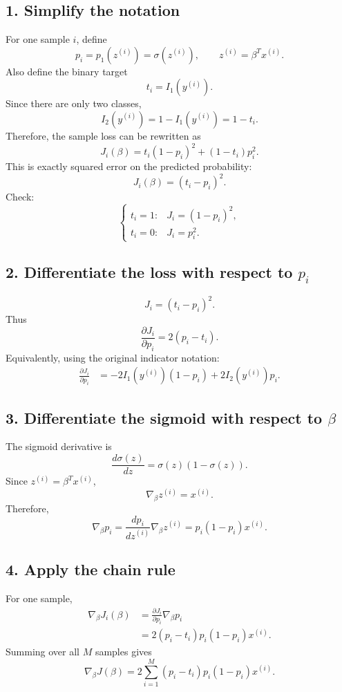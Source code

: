 \documentclass[11pt]{article}
\begin{document}
\subsection*{1. Simplify the notation}

For one sample \(i\), define
\[
    p_i = p_1(z^{(i)}) = \sigma(z^{(i)}),
    \qquad
    z^{(i)} = \beta^T x^{(i)}.
\]
Also define the binary target
\[
    t_i = I_1(y^{(i)}).
\]
Since there are only two classes,
\[
    I_2(y^{(i)}) = 1 - I_1(y^{(i)}) = 1-t_i.
\]
Therefore, the sample loss can be rewritten as
\[
    J_i(\beta)
    =
    t_i(1-p_i)^2 + (1-t_i)p_i^2.
\]
This is exactly squared error on the predicted probability:
\[
    J_i(\beta) = (t_i-p_i)^2.
\]
Check:
\[
    \begin{cases}
    t_i=1: & J_i = (1-p_i)^2, \\
    t_i=0: & J_i = p_i^2.
    \end{cases}
\]

\subsection*{2. Differentiate the loss with respect to \(p_i\)}

\[
    J_i = (t_i-p_i)^2.
\]
Thus
\[
    \frac{\partial J_i}{\partial p_i}
    =
    2(p_i-t_i).
\]
Equivalently, using the original indicator notation:
\[
\begin{aligned}
    \frac{\partial J_i}{\partial p_i}
    &=
    -2I_1(y^{(i)})(1-p_i)+2I_2(y^{(i)})p_i.
\end{aligned}
\]

\subsection*{3. Differentiate the sigmoid with respect to \(\beta\)}

The sigmoid derivative is
\[
    \frac{d\sigma(z)}{dz}
    =
    \sigma(z)(1-\sigma(z)).
\]
Since \(z^{(i)}=\beta^T x^{(i)}\),
\[
    \nabla_\beta z^{(i)} = x^{(i)}.
\]
Therefore,
\[
    \nabla_\beta p_i
    =
    \frac{dp_i}{dz^{(i)}}\nabla_\beta z^{(i)}
    =
    p_i(1-p_i)x^{(i)}.
\]

\subsection*{4. Apply the chain rule}

For one sample,
\[
\begin{aligned}
    \nabla_\beta J_i(\beta)
    &=
    \frac{\partial J_i}{\partial p_i}\nabla_\beta p_i \\
    &=
    2(p_i-t_i)p_i(1-p_i)x^{(i)}.
\end{aligned}
\]
Summing over all \(M\) samples gives
\[
    \boxed{
    \nabla_\beta J(\beta)
    =
    2\sum_{i=1}^{M}
    \left(p_i-t_i\right)p_i(1-p_i)x^{(i)}
    }.
\]
\end{document}
